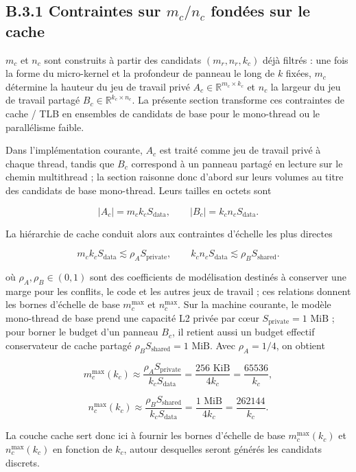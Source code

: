 \documentclass[a4paper,11pt,oneside]{article}
\begin{document}
\subsection*{B.3.1 Contraintes sur $m_c/n_c$ fondées sur le cache}

$m_c$ et $n_c$ sont construits à partir des candidats $(m_r,n_r,k_c)$ déjà filtrés : une fois la forme du micro-kernel et la profondeur de panneau le long de $k$ fixées, $m_c$ détermine la hauteur du jeu de travail privé $A_c \in \mathbb{R}^{m_c \times k_c}$ et $n_c$ la largeur du jeu de travail partagé $B_c \in \mathbb{R}^{k_c \times n_c}$. La présente section transforme ces contraintes de cache / TLB en ensembles de candidats de base pour le mono-thread ou le parallélisme faible.

Dans l'implémentation courante, $A_c$ est traité comme jeu de travail privé à chaque thread, tandis que $B_c$ correspond à un panneau partagé en lecture sur le chemin multithread ; la section raisonne donc d'abord sur leurs volumes au titre des candidats de base mono-thread. Leurs tailles en octets sont

$$
|A_c| = m_c k_c S_{\text{data}},
\qquad
|B_c| = k_c n_c S_{\text{data}}.
$$

La hiérarchie de cache conduit alors aux contraintes d'échelle les plus directes

$$
m_c k_c S_{\text{data}} \lesssim \rho_A S_{\text{private}},
\qquad
k_c n_c S_{\text{data}} \lesssim \rho_B S_{\text{shared}}.
$$

où $\rho_A,\rho_B \in (0,1)$ sont des coefficients de modélisation destinés à conserver une marge pour les conflits, le code et les autres jeux de travail ; ces relations donnent les bornes d'échelle de base $m_c^{\max}$ et $n_c^{\max}$. Sur la machine courante, le modèle mono-thread de base prend une capacité L2 privée par cœur $S_{\text{private}}=1\text{ MiB}$ ; pour borner le budget d'un panneau $B_c$, il retient aussi un budget effectif conservateur de cache partagé $\rho_B S_{\text{shared}} = 1\text{ MiB}$. Avec $\rho_A = 1/4$, on obtient

$$
m_c^{\max}(k_c) \approx \frac{\rho_A S_{\text{private}}}{k_c S_{\text{data}}}
= \frac{256\text{ KiB}}{4k_c}
= \frac{65536}{k_c},
$$

$$
n_c^{\max}(k_c) \approx \frac{\rho_B S_{\text{shared}}}{k_c S_{\text{data}}}
= \frac{1\text{ MiB}}{4k_c}
= \frac{262144}{k_c}.
$$

La couche cache sert donc ici à fournir les bornes d'échelle de base $m_c^{\max}(k_c)$ et $n_c^{\max}(k_c)$ en fonction de $k_c$, autour desquelles seront générés les candidats discrets.
\end{document}
